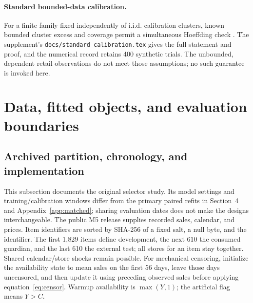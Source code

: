 \paragraph{Standard bounded-data calibration.}\label{app:calibration}
For a finite family fixed independently of i.i.d. calibration clusters, known bounded cluster excess and coverage permit a simultaneous Hoeffding check \citep{hoeffding1963}. The supplement's \texttt{docs/standard\_calibration.tex} gives the full statement and proof, and the numerical record retains 400 synthetic trials. The unbounded, dependent retail observations do not meet those assumptions; no such guarantee is invoked here.

\section{Data, fitted objects, and evaluation boundaries}
\label{app:repro}
\subsection{Archived partition, chronology, and implementation}
This subsection documents the original selector study. Its model settings and training/calibration windows differ from the primary paired refits in Section~4 and Appendix~\ref{app:matched}; sharing evaluation dates does not make the designs interchangeable.
The public M5 release \citep{m5data} supplies recorded sales, calendar, and prices. Item identifiers are sorted by SHA-256 of a fixed salt, a null byte, and the identifier. The first 1,829 items define development, the next 610 the consumed guardian, and the last 610 the external test; all stores for an item stay together. Shared calendar/store shocks remain possible. For mechanical censoring, initialize the availability state to mean sales on the first 56 days, leave those days uncensored, and then update it using preceding observed sales before applying equation~\eqref{eq:censor}. Warmup availability is $\max(Y,1)$; the artificial flag means $Y>C$.

